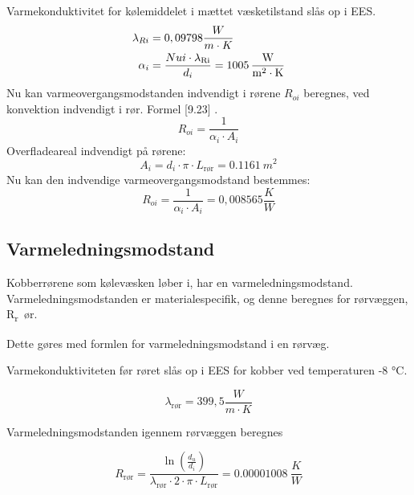 \documentclass[../Hovedrapport.tex]{subfiles}
\begin{document}
Varmekonduktivitet for kølemiddelet i mættet væsketilstand slås op i EES.
\begin{align}
\lambda_{Ri} &= \si{0,09798}{\frac{W}{m \cdot K}} \\
\alpha_{i} &= \frac{{Nui} \cdot \si{\lambda_{Ri}}}{d_{i}} = \SI{1005}{\frac{\watt}{m^2 \cdot K}}
\end{align}
Nu kan varmeovergangsmodstanden indvendigt i rørene $R_{oi}$ beregnes, ved konvektion indvendigt i rør. Formel [9.23] \citep{termo}.
\begin{equation}
R_{oi} = \frac {1}{\alpha_{i} \cdot  A_{i}} 
\end{equation}
Overfladeareal indvendigt på rørene:
\begin{equation}
A_{i} = d_{i} \cdot  \pi \cdot  L_{\text{rør}} = \SI{0,1161}{m^2}
\end{equation}
Nu kan den indvendige varmeovergangsmodstand bestemmes:
\begin{equation}
R_{oi} = \frac {1}{\alpha_{i} \cdot  A_{i}} = \si{0,008565}{\frac{K}{W}}
\end{equation}

\subsection{Varmeledningsmodstand}
    \label{sec:Varmeledningsmodstand}

Kobberrørene som kølevæsken løber i, har en varmeledningsmodstand. Varmeledningsmodstanden er materialespecifik, og denne beregnes for rørvæggen, \si{R_rør}. 
 
Dette gøres med formlen for varmeledningsmodstand i en rørvæg.

Varmekonduktiviteten før røret slås op i EES for kobber ved temperaturen -8 $\si{\celsius}$.

\begin{equation}
\lambda_\text{rør} = \si{399,5}{\frac{W}{m \cdot K}}
\end{equation}

Varmeledningsmodstanden igennem rørvæggen beregnes

\begin{equation}
R_\text{rør} = \frac {\ln{ \left( \frac{d_{u}}{d_{i}} \right) }}{  \lambda_{\text{rør}} \cdot  2 \cdot  \pi \cdot  L_{\text{rør}}} =\SI{0,00001008}{\frac{K}{W}}
\end{equation}

\end{document}
